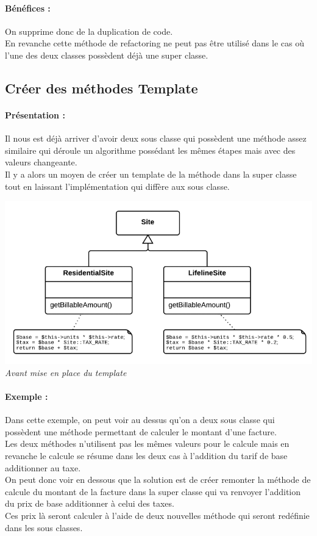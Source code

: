 \documentclass[a4paper,twoside,12pt,openright]{report}
\begin{document}
\paragraph{Bénéfices :}
On supprime donc de la duplication de code.\\
En revanche cette méthode de refactoring ne peut pas être utilisé dans le cas où l'une des deux classes possèdent déjà une super classe.\\

\subsection{Créer des méthodes Template}
\paragraph{Présentation :}
Il nous est déjà arriver d'avoir deux sous classe qui possèdent une méthode assez similaire qui déroule un algorithme possédant les mêmes étapes mais avec des valeurs changeante.\\
Il y a alors un moyen de créer un template de la méthode dans la super classe tout en laissant l'implémentation qui diffère aux sous classe.\\

\begin{center}
\includegraphics[scale=0.75]{Image/Template.png}\\
\itshape{Avant mise en place du template \cite{ref5}}
\end{center}

\paragraph{Exemple :}
Dans cette exemple, on peut voir au dessus qu'on a deux sous classe qui possèdent une méthode permettant de calculer le montant d'une facture.\\
Les deux méthodes n'utilisent pas les mêmes valeurs pour le calcule mais en revanche le calcule se résume dans les deux cas à l'addition du tarif de base additionner au taxe.\\
On peut donc voir en dessous que la solution est de créer remonter la méthode de calcule du montant de la facture dans la super classe qui va renvoyer l'addition du prix de base additionner à celui des taxes.\\
Ces prix là seront calculer à l'aide de deux nouvelles méthode qui seront redéfinie dans les sous classes.\\
\end{document}
